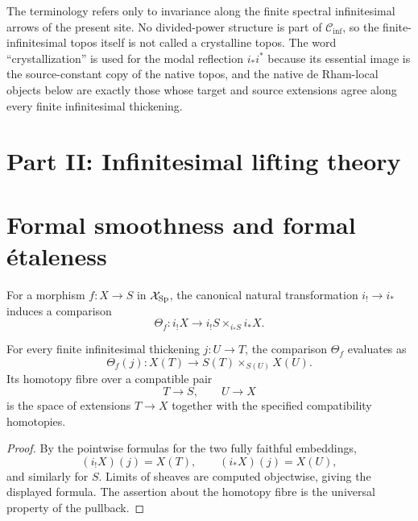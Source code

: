 \begin{remark}
\label{rem:infinitesimal-crystalline-terminology}
The terminology refers only to invariance along the finite spectral
infinitesimal arrows of the present site.  No divided-power structure is part
of $\mathcal C_{\mathrm{inf}}$, so the finite-infinitesimal topos itself is
not called a crystalline topos.  The word ``crystallization'' is used for the
modal reflection $i_*i^*$ because its essential image is the source-constant
copy of the native topos, and the native de Rham-local objects below are
exactly those whose target and source extensions agree along every finite
infinitesimal thickening.
\end{remark}

\section*{Part II: Infinitesimal lifting theory}

\section{Formal smoothness and formal \texorpdfstring{\'etaleness}{etaleness}}
\label{sec:infinitesimal-formal-smooth-etale}

For a morphism $f:X\to S$ in $\mathcal X_{\mathrm{Sp}}$, the canonical natural
transformation $i_!\to i_*$ induces a comparison
\[
    \Theta_f:
    i_!X
    \longrightarrow
    i_!S\times_{i_*S}i_*X.
\]

\begin{proposition}
\label{prop:infinitesimal-theta-pointwise}
For every finite infinitesimal thickening $j:U\to T$, the comparison
$\Theta_f$ evaluates as
\[
    \boxed{
    \Theta_f(j):
    X(T)
    \longrightarrow
    S(T)\times_{S(U)}X(U).
    }
\]
Its homotopy fibre over a compatible pair
\[
    T\longrightarrow S,
    \qquad
    U\longrightarrow X
\]
is the space of extensions $T\to X$ together with the specified compatibility
homotopies.
\end{proposition}

\begin{proof}
By the pointwise formulas for the two fully faithful embeddings,
\[
    (i_!X)(j)=X(T),
    \qquad
    (i_*X)(j)=X(U),
\]
and similarly for $S$.  Limits of sheaves are computed objectwise, giving the
displayed formula.  The assertion about the homotopy fibre is the universal
property of the pullback.
\end{proof}

